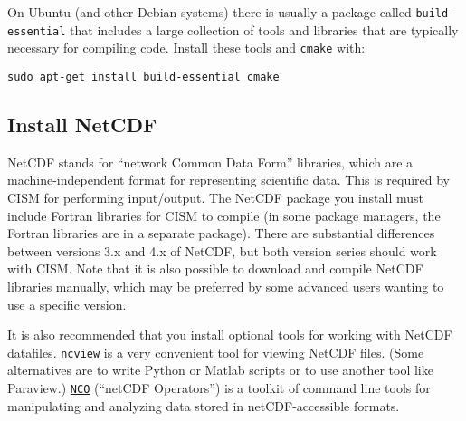 \begin{mdframed}[style=ubuntu] %
On Ubuntu (and other Debian systems) there is usually a package called \texttt{build-essential} 
that includes a large collection of tools and libraries that are typically necessary
for compiling code. Install these tools and \texttt{cmake} with:

\texttt{sudo apt-get install build-essential cmake}
\end{mdframed}                 %


\subsection{Install NetCDF}
\label{sec:install-netcdf}
NetCDF stands for ``network Common Data Form'' libraries, which are a
 machine-independent format for representing scientific data.
This is required by CISM for performing input/output.  The NetCDF package you 
install must include Fortran libraries for CISM to compile (in some package managers,
the Fortran libraries are in a separate package).  There are substantial differences 
between versions 3.x and 4.x of NetCDF, but both version series should work with CISM. 
Note that it is also possible to download and compile NetCDF libraries manually, 
which may be preferred by some advanced users wanting to use a specific version.

It is also recommended that you install optional tools for working with NetCDF datafiles.
\href{http://meteora.ucsd.edu/~pierce/ncview_home_page.html}{\texttt{ncview}} is a very convenient tool for viewing NetCDF files.  (Some alternatives are to write Python or Matlab scripts or to use another
tool like Paraview.)  
\href{http://nco.sourceforge.net/}{\texttt{NCO}} (``netCDF Operators'') is a toolkit of command line tools
for manipulating and analyzing data stored in netCDF-accessible formats.

